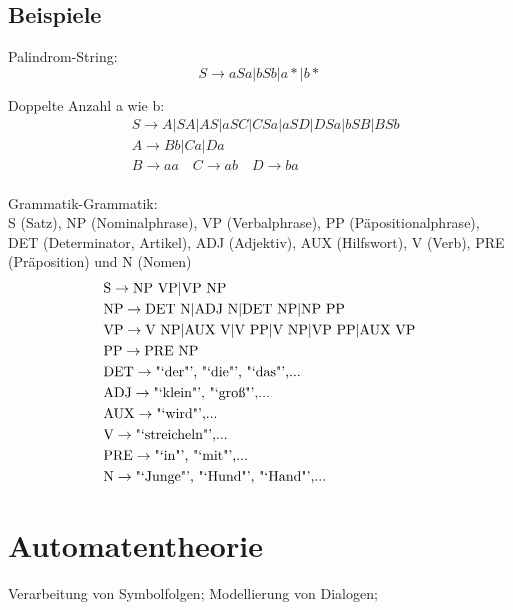 \documentclass[german,color,6pt]{latex4ei/latex4ei_sheet}
\begin{document}
\begin{sectionbox}
\subsection{Beispiele}
Palindrom-String:
\begin{equation*}
S \rightarrow aSa | bSb | a* | b*
\end{equation*}

Doppelte Anzahl a wie b:
\begin{equation*}
\begin{split}
	& S \rightarrow A | SA | AS | aSC | CSa | aSD | DSa | bSB | BSb \\
	& A \rightarrow Bb | Ca | Da \\
	& B \rightarrow aa \quad C \rightarrow ab \quad D \rightarrow ba \\
\end{split}
\end{equation*}

Grammatik-Grammatik:\\
S (Satz), NP (Nominalphrase), VP (Verbalphrase), PP (Päpositionalphrase), DET (Determinator, Artikel), ADJ (Adjektiv), AUX (Hilfswort), V (Verb), PRE (Präposition) und N (Nomen)
\begin{equation*}
\begin{split}
	&  \text{S} \rightarrow \text{NP VP} | \text{VP NP}\\
	& \text{NP} \rightarrow  \text{DET N} |  \text{ADJ N} |  \text{DET NP} |  \text{NP PP}\\
	&  \text{VP} \rightarrow  \text{V NP} |  \text{AUX V} |  \text{V PP} |  \text{V NP} |  \text{VP PP} |  \text{AUX VP}\\
	&  \text{PP} \rightarrow  \text{PRE NP}\\
	&  \text{DET} \rightarrow  \text{"`der"', "`die"', "`das"',...}\\
	&  \text{ADJ} \rightarrow  \text{"`klein"', "`groß"',...}\\
	&  \text{AUX} \rightarrow  \text{"`wird"',...}\\
	&  \text{V} \rightarrow  \text{"`streicheln"',...}\\
	&  \text{PRE} \rightarrow  \text{"`in"', "`mit"',...}\\
	&  \text{N} \rightarrow  \text{"`Junge"', "`Hund"', "`Hand"',...}\\
\end{split}
\end{equation*}
\end{sectionbox}


\section{Automatentheorie}
\begin{symbolbox}
Verarbeitung von Symbolfolgen; Modellierung von Dialogen; 
\end{symbolbox}
\end{document}

